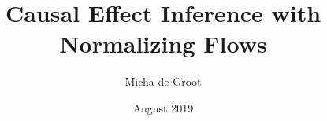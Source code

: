 \documentclass{article}
\title{Causal Effect Inference with Normalizing Flows}
\author{Micha de Groot}
\date{August 2019}
\newcommand{\parfrac}[2]{\frac{\partial #1}{\partial#2}}
\begin{document}
\noindent




\end{document}
